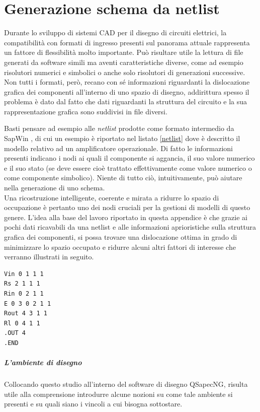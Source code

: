 \chapter{Generazione schema da netlist}

Durante lo sviluppo di sistemi CAD per il disegno di circuiti elettrici, la compatibilità con formati di ingresso presenti sul panorama attuale rappresenta un fattore di flessibilità molto importante. Può risultare utile la lettura di file generati da software simili ma aventi caratteristiche diverse, come ad esempio risolutori numerici e simbolici o anche solo risolutori di generazioni successive. Non tutti i formati, però, recano con sé informazioni riguardanti la dislocazione grafica dei componenti all'interno di uno spazio di disegno, addirittura spesso il problema è dato dal fatto che dati riguardanti la struttura del circuito e la sua rappresentazione grafica sono suddivisi in file diversi.

Basti pensare ad esempio alle \textit{netlist} prodotte come formato intermedio da SapWin \cite{sapwin}, di cui un esempio è riportato nel listato \ref{netlist} dove è descritto il modello relativo ad un amplificatore operazionale. Di fatto le informazioni presenti indicano i nodi ai quali il componente si aggancia, il suo valore numerico e il suo stato (se deve essere cioè trattato effettivamente come valore numerico o come componente simbolico). Niente di tutto ciò, intuitivamente, può aiutare nella generazione di uno schema.\\
Una ricostruzione intelligente, coerente e mirata a ridurre lo spazio di occupazione è pertanto uno dei nodi cruciali per la gestioni di modelli di questo genere. L'idea alla base del lavoro riportato in questa appendice è che grazie ai pochi dati ricavabili da una netlist e alle informazioni aprioristiche sulla struttura grafica dei componenti, si possa trovare una dislocazione ottima in grado di minimizzare lo spazio occupato e ridurre alcuni altri fattori di interesse che verranno illustrati in seguito.
\lstset{basicstyle=\small, language=, breaklines, breakatwhitespace}

\begin{lstlisting}[caption={Esempio di netlist},float,captionpos=b,label=netlist,frame=lines]
Vin 0 1 1 1
Rs 2 1 1 1
Rin 0 2 1 1
E 0 3 0 2 1 1
Rout 4 3 1 1
Rl 0 4 1 1
.OUT 4
.END
\end{lstlisting}

\paragraph{L'ambiente di disegno}
Collocando questo studio all'interno del software di disegno QSapecNG, risulta utile alla comprensione introdurre alcune nozioni su come tale ambiente si presenti e su quali siano i vincoli a cui bisogna sottostare.

